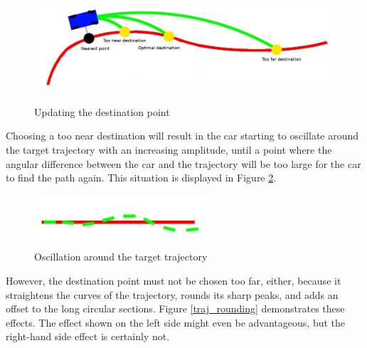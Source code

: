 \begin{figure}[!ht]
    \centering
    \includegraphics[height=40mm]{figures/raw/jpeg/dest_point_update.jpg}
    \caption{Updating the destination point}
    \label{dest_point_update}
\end{figure}

Choosing a too near destination will result in the car starting to oscillate around the target trajectory with an increasing amplitude, until a point where the angular difference between the car and the trajectory will be too large for the car to find the path again. This situation is displayed in Figure \ref{traj_oscillation}.

\begin{figure}[!ht]
    \centering
    \includegraphics[width=65mm]{figures/raw/jpeg/traj_oscillation.jpg}
    \caption{Oscillation around the target trajectory}
    \label{traj_oscillation}
\end{figure}

However, the destination point must not be chosen too far, either, because it straightens the curves of the trajectory, rounds its sharp peaks, and adds an offset to the long circular sections. Figure \ref{traj_rounding} demonstrates these effects. The effect shown on the left side might even be advantageous, but the right-hand side effect is certainly not.

